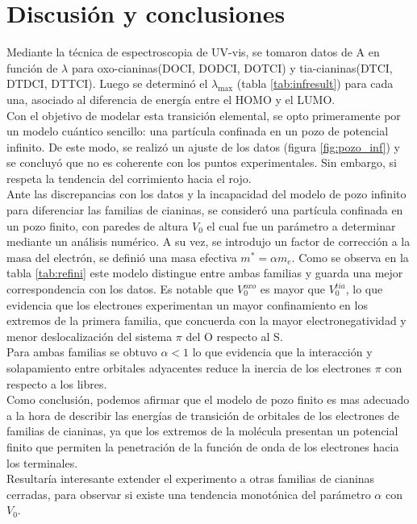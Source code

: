 \documentclass[12pt,a4paper,twocolumn]{informeUNLP} %
\begin{document}
\section{Discusión y conclusiones}
Mediante la técnica de espectroscopia de UV-vis, se tomaron datos de A en función de $\lambda$ para oxo-cianinas(DOCI, DODCI, DOTCI) y tia-cianinas(DTCI, DTDCI, DTTCI). Luego se determinó el $\lambda_{\max}$ (tabla \ref{tab:infresult}) para cada una, asociado al diferencia de energía entre el HOMO y el LUMO. \\Con el objetivo de modelar esta transición elemental, se opto primeramente por un modelo cuántico sencillo: una partícula confinada en un pozo de potencial infinito. De este modo, se realizó un ajuste de los datos (figura \ref{fig:pozo_inf}) y se concluyó que no es coherente con los puntos experimentales. Sin embargo, si respeta la tendencia del corrimiento hacia el rojo. \\ 
Ante las discrepancias con los datos y la incapacidad del modelo de pozo infinito para diferenciar las familias de cianinas, se consideró
una partícula confinada en un pozo finito, con paredes de altura $V_0$ el cual fue un parámetro a determinar mediante un análisis numérico. A su vez, se introdujo un factor de corrección a la masa del electrón, se definió una masa efectiva $m^* = \alpha m_e$. Como se observa en la tabla \ref{tab:refini} este modelo distingue entre ambas familias y guarda una mejor correspondencia con los datos. Es notable que $V_{0}^{oxo}$ es mayor que $V_{0}^{tia}$, %
lo que evidencia que los electrones experimentan un mayor confinamiento en los extremos de la primera familia, que concuerda con la mayor electronegatividad y menor deslocalización del sistema $\pi$ del O respecto al S. \\
Para ambas familias se obtuvo $\alpha <1$ lo que evidencia que la interacción y solapamiento  entre orbitales adyacentes reduce la inercia de los electrones $\pi$ con respecto a los libres.\\
Como conclusión, podemos afirmar que el modelo de pozo finito es mas adecuado a la hora de describir las energías de transición de orbitales de los electrones de familias de cianinas, ya que los extremos de la molécula presentan un potencial finito que permiten la penetración de la función de onda de los electrones hacia los terminales. \\ Resultaría interesante extender el experimento a otras familias de cianinas cerradas, para observar si existe una tendencia monotónica del parámetro $\alpha$ con $V_0$.
\end{document}
